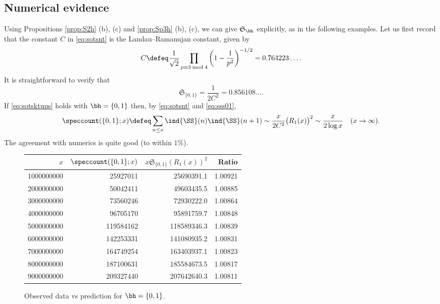 \documentclass[12pt, reqno, twoside, letterpaper]{amsart}
\begin{document}
\subsection{Numerical evidence}
\label{sec:numerical-evidence}
%
Using Propositions \ref{prop:S2h} (b), (c) and 
\ref{prop:Sp3h} (b), (c), we can give $\mathfrak{S}_{\bh}$ 
explicitly, as in the following examples.
%
Let us first record that the constant $C$ in \eqref{eq:sotsnt} is 
the Landau--Ramanujan constant, given by 
\begin{equation}
 \label{eq:defLanRamconst}
  C
   \defeq 
    \frac{1}{\sqrt{2}}
     \prod_{p \equiv 3 \bmod 4}
      \bigg(
       1 - \frac{1}{p^2}
      \bigg)^{-1/2}
       =
        0.764223\ldots.
\end{equation}
%
It is straightforward to verify that   
\begin{equation}
 \label{eq:sss01}
  \mathfrak{S}_{\{0,1\}}
   =
    \frac{1}{2C^2} 
     =
      0.856108\ldots.
\end{equation}
%
If \eqref{eq:sotsktups} holds with $\bh = \{0,1\}$ then, by 
\eqref{eq:sotsnt} and \eqref{eq:sss01}, 
\[
 \speccount(\{0,1\}; x)
  \defeq 
   \sum_{n \le x} \ind{\SS}(n)\ind{\SS}(n + 1)
    \sim 
     \frac{x}{2C^2}
      \big(R_1(x)\big)^2
       \sim 
        \frac{x}{2\log x}
         \quad 
       (x \to \infty).
\]
The agreement with numerics is quite good (to within $1 \%$).
%
\begin{figure}[ht]
%
\begin{tabular}{|r|r|r|r|}
\hline 
$x$ & {\small $\speccount(\{0,1\}; x)$ } & {\small $x\mathfrak{S}_{\{0,1\}}(R_1(x))^2$ } & Ratio \\
\hline
1000000000  &  25927011 &   25690391.1 & 1.00921  \\
2000000000  &  50042411 &   49603435.5 & 1.00885  \\
3000000000  &  73560246 &   72930222.0 & 1.00864  \\
4000000000  &  96705170 &   95891759.7 & 1.00848  \\
5000000000  & 119584162 &  118589346.3 & 1.00839  \\
6000000000  & 142253331 &  141080935.2 & 1.00831  \\
7000000000  & 164749254 &  163403937.1 & 1.00823  \\
8000000000  & 187100631 &  185584673.5 & 1.00817  \\
9000000000  & 209327440 &  207642640.3 & 1.00811  \\
\hline
\end{tabular}   
%
\caption{Observed data vs prediction for $\bh = \{0,1\}$. }
%
\label{fig:table1}
%
\end{figure}
\end{document}
